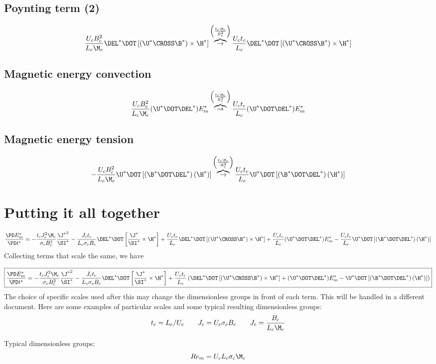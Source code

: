 \documentclass[11pt]{article}
\newcommand{\OB}{\overbrace{\rightarrow}^{\left(\frac{t_c \M_c}{B_c^2}\right)}}
\begin{document}
\subsection{Poynting term (2)}
\begin{equation}
	\frac{U_c B_c^2}{L_c \M_c} \DEL^* \DOT \left[\left(\U^* \CROSS \B^* \right) \times \H^* \right]
	\OB
	\frac{U_c t_c}{L_c} \DEL^* \DOT \left[\left(\U^* \CROSS \B^* \right) \times \H^* \right]
\end{equation}
\subsection{Magnetic energy convection}
\begin{equation}
	\frac{U_c B_c^2}{L_c \M_c} (\U^* \DOT \DEL^*) E_m^*
	\OB
	\frac{U_c t_c}{L_c} (\U^* \DOT \DEL^*) E_m^*
\end{equation}
\subsection{Magnetic energy tension}
\begin{equation}
	- \frac{U_c B_c^2}{L_c \M_c} \U^* \DOT \left[(\B^* \DOT \DEL^*) \left( \H^* \right) \right]
	\OB
	\frac{U_c t_c}{L_c} \U^* \DOT \left[(\B^* \DOT \DEL^*) \left( \H^* \right) \right]
\end{equation}
\section{Putting it all together}
\begin{equation}
	\frac{\PD E_m^*}{\PD t^*} = 
	- \frac{t_c J_c^2 \M_c}{\sigma_c B_c^2} \frac{{\J^*}^2}{\SI^*}
	- \frac{J_c t_c}{L_c \sigma_c B_c} \DEL^* \DOT \left[\frac{\J^*}{\SI^*} \times \H^* \right]
	+ \frac{U_c t_c}{L_c} \DEL^* \DOT \left[\left(\U^* \CROSS \B^* \right) \times \H^* \right]
	+ \frac{U_c t_c}{L_c} (\U^* \DOT \DEL^*) E_m^*
	- \frac{U_c t_c}{L_c} \U^* \DOT \left[(\B^* \DOT \DEL^*) \left( \H^* \right) \right]
\end{equation}
Collecting terms that scale the same, we have

\begin{equation}
	\boxed{
	\frac{\PD E_m^*}{\PD t^*} = 
	- \frac{t_c J_c^2 \M_c}{\sigma_c B_c^2} \frac{{\J^*}^2}{\SI^*}
	- \frac{J_c t_c}{L_c \sigma_c B_c} \DEL^* \DOT \left[\frac{\J^*}{\SI^*} \times \H^* \right]
	+ \frac{U_c t_c}{L_c} \left( 
	\DEL^* \DOT \left[\left(\U^* \CROSS \B^* \right) \times \H^* \right]
	+ (\U^* \DOT \DEL^*) E_m^*
	- \U^* \DOT \left[(\B^* \DOT \DEL^*) \left( \H^* \right) \right]
	\right)
	}
\end{equation}
The choice of specific scales used after this may change the dimensionless groups in front of each term. This will be handled in a different document. Here are some examples of particular scales and some typical resulting dimensionless groups:
\begin{equation}\begin{aligned}
	t_c = L_c/ U_c \qquad
	J_c = U_c \sigma_c B_c \qquad
	J_c = \frac{B_c}{L_c \M_c}
\end{aligned}\end{equation}

Typical dimensionless groups:
\begin{equation}
	Re_m = U_c L_c \sigma_c \M_c
\end{equation}
\end{document}
